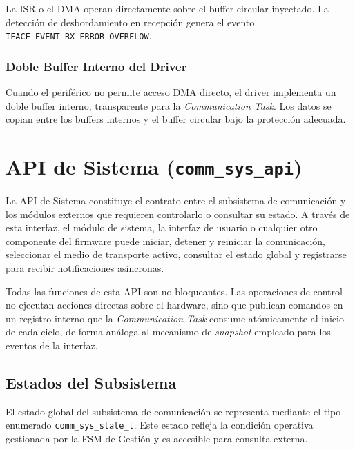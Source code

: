 La ISR o el DMA operan directamente sobre el buffer circular inyectado. La detección de desbordamiento en recepción genera el evento \texttt{IFACE\_EVENT\_RX\_ERROR\_OVERFLOW}.

\subsubsection{Doble Buffer Interno del Driver}

Cuando el periférico no permite acceso DMA directo, el driver implementa un doble buffer interno, transparente para la \textit{Communication Task}. Los datos se copian entre los buffers internos y el buffer circular bajo la protección adecuada.


\section{API de Sistema (\texttt{comm\_sys\_api})}
\label{sec:api-sistema}

La API de Sistema constituye el contrato entre el subsistema de comunicación y los módulos externos que requieren controlarlo o consultar su estado. A través de esta interfaz, el módulo de sistema, la interfaz de usuario o cualquier otro componente del firmware puede iniciar, detener y reiniciar la comunicación, seleccionar el medio de transporte activo, consultar el estado global y registrarse para recibir notificaciones asíncronas.

Todas las funciones de esta API son no bloqueantes. Las operaciones de control no ejecutan acciones directas sobre el hardware, sino que publican comandos en un registro interno que la \textit{Communication Task} consume atómicamente al inicio de cada ciclo, de forma análoga al mecanismo de \textit{snapshot} empleado para los eventos de la interfaz.

\subsection{Estados del Subsistema}
\label{subsec:sys-estados}

El estado global del subsistema de comunicación se representa mediante el tipo enumerado \texttt{comm\_sys\_state\_t}. Este estado refleja la condición operativa gestionada por la FSM de Gestión y es accesible para consulta externa.

